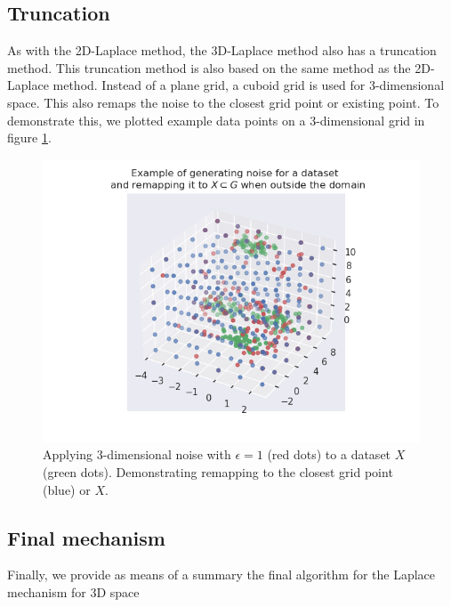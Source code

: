 \subsection{Truncation}
As with the 2D-Laplace method, the 3D-Laplace method also has a truncation method.
This truncation method is also based on the same method as the 2D-Laplace method.
Instead of a plane grid, a cuboid grid is used for 3-dimensional space.
This also remaps the noise to the closest grid point or existing point.
To demonstrate this, we plotted example data points on a 3-dimensional grid in figure \ref{fig:3d-laplace-example}.
\begin{figure} [ht]
  \includegraphics{TheorethicalFramework/ND-Laplace/Images/example_3d_laplace.png}
  \caption{Applying 3-dimensional noise with $\epsilon = 1$ (red dots) to a dataset $X$ (green dots). Demonstrating remapping to the closest grid point (blue) or $X$.}
  \label{fig:3d-laplace-example}
\end{figure}

\newpage
\subsection{Final mechanism}
Finally, we provide as means of a summary the final algorithm for the Laplace mechanism for 3D space

\newpage